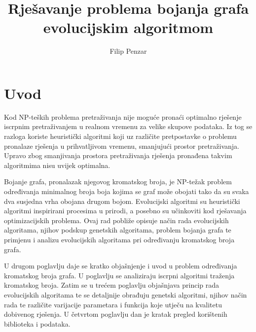 \documentclass[times, utf8, zavrsni, numeric]{fer}
\begin{document}

\title{Rješavanje problema bojanja grafa evolucijskim algoritmom}

\author{Filip Penzar}

\maketitle


\zahvala{}

\tableofcontents

\chapter{Uvod}
Kod NP-teških problema pretraživanja nije moguće pronaći optimalno rješenje iscrpnim pretraživanjem u realnom vremenu za velike skupove podataka. Iz tog se razloga koriste heuristički algoritmi koji uz različite pretpostavke o problemu pronalaze rješenja u prihvatljivom vremenu, smanjujući prostor pretraživanja. Upravo zbog smanjivanja prostora pretraživanja rješenja pronađena takvim algoritmima nisu uvijek optimalna.

Bojanje grafa, pronalazak njegovog kromatskog broja, je NP-težak problem određivanja minimalnog broja boja kojima se graf može obojati tako da su svaka dva susjedna vrha obojana drugom bojom. Evolucijski algoritmi su heuristički algoritmi inspirirani procesima u prirodi, a posebno su učinkoviti kod rješavanja optimizacijskih problema. Ovaj rad pobliže opisuje način rada evolucijskih algoritama, njihov podskup genetskih algoritama, problem bojanja grafa te primjenu i analizu evolucijskih algoritama pri određivanju kromatskog broja grafa.

U drugom poglavlju daje se kratko objašnjenje i uvod u problem određivanja kromatskog broja grafa. U poglavlju se analiziraju iscrpni algoritmi traženja kromatskog broja. Zatim se u trećem poglavlju objašnjava princip rada evolucijskih algoritama te se detaljnije obrađuju genetski algoritmi, njihov način rada te različite varijacije parametara i funkcija koje utječu na kvalitetu dobivenog rješenja. U četvrtom poglavlju dan je kratak pregled korištenih biblioteka i podataka. 
\end{document}
